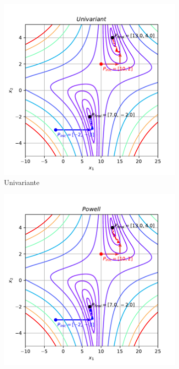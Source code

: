 \documentclass[10pt, a4paper]{article}
\begin{document}
\begin{figure}[htpb]
  \centering
  \begin{subfigure}[b]{0.32\textwidth}
      \centering
      \includegraphics[width=\textwidth]{images/q1b_Univariant.pdf}
      \caption{Univariante}
      \label{fig:q1b_univariant}
  \end{subfigure}
  \hfill
  \begin{subfigure}[b]{0.32\textwidth}
    \centering
    \includegraphics[width=\textwidth]{images/q1b_Powell.pdf}

\end{subfigure}
\end{figure}
\end{document}
